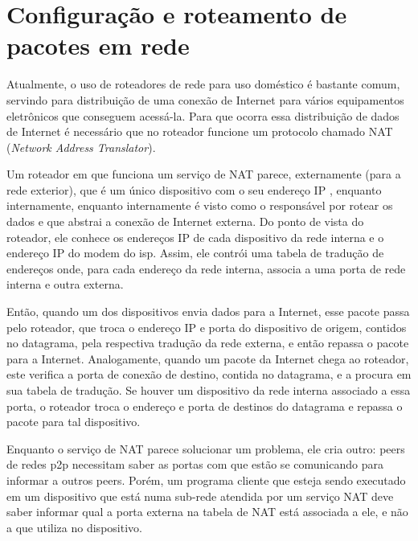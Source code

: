
\section{Configuração e roteamento de pacotes em rede}

\begin{comment}
Em alguns roteadores que são ponte entre a Internet e a rede que ele gerencia, existe
uma função de se configurar portas de comunicação de rede automaticamente usando-se o
\emph{Network Address Translation Port Mapping Protocol}. Assim, não é necessário
realizar uma configuração específica somente pare esse fim.
\end{comment}

Atualmente, o uso de roteadores de rede para uso doméstico é bastante comum, servindo
para distribuição de uma conexão de Internet para vários equipamentos eletrônicos que
conseguem acessá-la. Para que ocorra essa distribuição de dados de Internet é
necessário que no roteador funcione um protocolo chamado NAT
(\emph{Network Address Translator}).

Um roteador em que funciona um serviço de NAT parece, externamente (para a rede
exterior), que é um único dispositivo com o seu endereço IP \cite{book:kurose}, enquanto
internamente, enquanto internamente é visto como o responsável por rotear os dados e
que abstrai a conexão de Internet externa. Do ponto de vista do roteador, ele conhece os
endereços IP de cada dispositivo da rede interna e o endereço IP do modem do \gls{isp}.
Assim, ele contrói uma tabela de tradução de endereços onde, para cada endereço da rede
interna, associa a uma porta de rede interna e outra externa.

Então, quando um dos dispositivos envia dados para a Internet, esse pacote passa pelo
roteador, que troca o endereço IP e porta do dispositivo de origem, contidos no
datagrama, pela respectiva tradução da rede externa, e então repassa o pacote para a
Internet. Analogamente, quando um pacote da Internet chega ao roteador, este verifica a
porta de conexão de destino, contida no datagrama, e a procura em sua tabela de
tradução. Se houver um dispositivo da rede interna associado a essa porta, o roteador
troca o endereço e porta de destinos do datagrama e repassa o pacote para tal
dispositivo.

Enquanto o serviço de NAT parece solucionar um problema, ele cria outro: \glspl*{peer}
de redes \gls*{p2p} necessitam saber as portas com que estão se comunicando para
informar a outros \glspl*{peer}. Porém, um programa cliente que esteja sendo executado
em um dispositivo que está numa sub-rede atendida por um serviço NAT deve saber informar
qual a porta externa na tabela de NAT está associada a ele, e não a que utiliza no
dispositivo.

